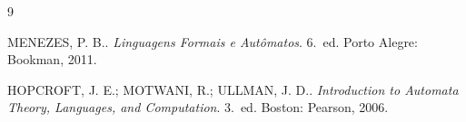\documentclass[12pt, a4paper]{article}
\theoremstyle{definition}
\theoremstyle{plain}
\theoremstyle{remark}
\begin{document}
\newpage
\begin{thebibliography}{9}

MENEZES, P. B.\@.
\textit{Linguagens Formais e Autômatos}.
6.~ed. Porto Alegre: Bookman, 2011.

HOPCROFT, J. E.; MOTWANI, R.; ULLMAN, J. D.\@.
\textit{Introduction to Automata Theory, Languages, and Computation}.
3.~ed. Boston: Pearson, 2006.

\end{thebibliography}
\end{document}

